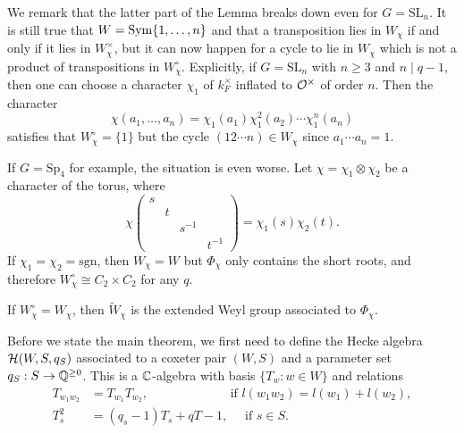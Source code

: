     We remark that the latter part of the Lemma breaks down even for $G=\mathrm{SL}_n$. It is still true that $W=\mathrm{Sym}\{1,\ldots,n\}$ and that a transposition lies in $W_\chi$ if and only if it lies in $W_\chi^\times$, but it can now happen for a cycle to lie in $W_\chi$ which is not a product of transpositions in $W_\chi^\circ$. Explicitly, if $G=\mathrm{SL}_n$ with $n\geq3$ and $n\mid q-1$, then one can choose a character $\chi_1$ of $k_F^\times$ inflated to $\mathcal{O}^\times$ of order $n$. Then the character 
    $$\chi(a_1,\ldots,a_n)=\chi_1(a_1)\chi_1^2(a_2)\cdots\chi_1^n(a_n)$$
    satisfies that $W_\chi^\circ=\{1\}$ but the cycle $(12\cdots n)\in W_\chi$ since $a_1\cdots a_n=1$.

    If $G=\mathrm{Sp}_4$ for example, the situation is even worse. Let $\chi=\chi_1\otimes\chi_2$ be a character of the torus, where 
    \begin{equation}
        \chi\left(\begin{smallmatrix}
            s&&&\\
            &t&&\\
            &&s^{-1}&\\
            &&&t^{-1}
        \end{smallmatrix}\right)=\chi_1(s)\chi_2(t).
    \end{equation}
    If $\chi_1=\chi_2=\textrm{sgn}$, then $W_\chi=W$ but $\Phi_\chi$ only contains the short roots, and therefore $W_\chi^\circ\cong C_2\times C_2$ for any $q$.

    \begin{lemma}
        If $W_\chi^\circ=W_\chi$, then $\widetilde{W}_\chi$ is the extended Weyl group associated to $\Phi_\chi$. 
    \end{lemma}

    Before we state the main theorem, we first need to define the Hecke algebra $\mathcal{H}(W,S,q_S)$ associated to a coxeter pair $(W,S)$ and a parameter set $q_S:S\rightarrow\mathbb{Q}^{\geq0}$. This is a $\mathbb{C}$-algebra with basis $\{T_w:w\in W\}$ and relations
    \begin{align*}
        T_{w_1w_2}&=T_{w_1}T_{w_2}, \ \quad\quad\quad\quad\quad\quad\text{ if } l(w_1w_2)=l(w_1)+l(w_2),\\
        T_s^2&=(q_s-1)T_s+qT-1,\quad \text{ if } s\in S.
    \end{align*}

